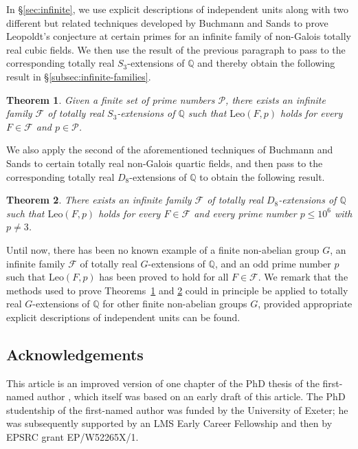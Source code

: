 \documentclass[12pt]{amsart}
\theoremstyle{plain}
\newtheorem{theorem}{Theorem}[section]
\theoremstyle{remark}
\theoremstyle{definition}
\newcommand{\Q}{\mathbb{Q}}
\newcommand{\Leo}{\mathrm{Leo}}
\numberwithin{equation}{section}
\begin{document}
In \S \ref{sec:infinite}, we use explicit descriptions of independent units along with 
two different but related techniques developed by Buchmann and Sands \cite{MR958040}
to prove Leopoldt's conjecture at certain primes for an infinite
family of non-Galois totally real cubic fields. 
We then use the result of the previous paragraph to pass to the corresponding totally real 
$S_{3}$-extensions of $\Q$ and thereby obtain the following result in \S \ref{subsec:infinite-families}.

\begin{theorem}\label{thm:intro-S3-big-result}
Given a finite set of prime numbers $\mathcal{P}$,
there exists an infinite family $\mathcal{F}$ of totally real 
$S_{3}$-extensions of $\Q$ such that $\Leo(F,p)$ holds for every $F \in \mathcal{F}$ and $p\in\mathcal{P}$.
\end{theorem}

We also apply the second of the aforementioned techniques of Buchmann and Sands
to certain totally real non-Galois quartic fields, and then pass to the corresponding
totally real $D_{8}$-extensions of $\Q$ to obtain the following result.

\begin{theorem}\label{thm:intro-D8-result}
There exists an infinite family $\mathcal{F}$ of totally real $D_{8}$-extensions of $\Q$
such that $\Leo(F,p)$ holds for every $F \in \mathcal{F}$ and every prime number $p \leq 10^{6}$ with $p \neq 3$. 
\end{theorem}

Until now, there has been no known example of a finite non-abelian group $G$,
an infinite family $\mathcal{F}$ of totally real $G$-extensions of $\Q$, and an odd prime number $p$ 
such that $\Leo(F,p)$ has been proved to hold for all $F \in \mathcal{F}$.
We remark that the methods used to prove Theorems~\ref{thm:intro-S3-big-result} 
and \ref{thm:intro-D8-result} could in principle be applied to totally real
$G$-extensions of $\Q$ for other finite non-abelian groups $G$, provided appropriate explicit descriptions of independent units can be found. 


\subsection*{Acknowledgements}
This article is an improved version of one chapter of the PhD thesis of the first-named author \cite[Chapter 3]{PhD-Ferri}, which itself was based on an early draft of this article.
The PhD studentship of the first-named author was funded by the University of Exeter; 
he was subsequently supported 
by an LMS Early Career Fellowship and then by EPSRC grant EP/W52265X/1.
\end{document}
